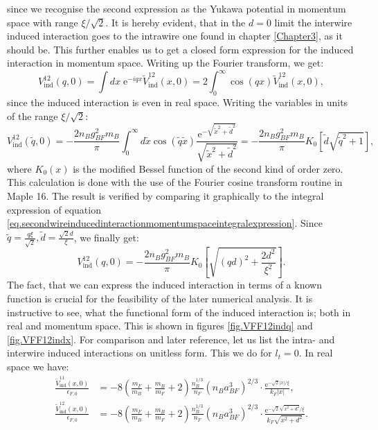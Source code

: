 since we recognise the second expression as the Yukawa potential in momentum space with range $\xi/\sqrt{2}$. It is hereby evident, that in the $d = 0$ limit the interwire induced interaction goes to the intrawire one found in chapter \ref{Chapter3}, as it should be. This further enables us to get a closed form expression for the induced interaction in momentum space. Writing up the Fourier transform, we get:
\begin{equation}
V_{\text{ind}}^{12}(q,0) = \int dx \; \text{e}^{-iqx}\tilde{V}_{\text{ind}}^{12}(x,0) = 2\int_0^\infty \cos(qx)\tilde{V}_{\text{ind}}^{12}(x,0), \nonumber
\end{equation}
since the induced interaction is even in real space. Writing the variables in units of the range $\xi/\sqrt{2}$:
\begin{equation}
V_{\text{ind}}^{12}(\tilde{q},0) = -\frac{2n_Bg^2_{BF}m_B}{\pi}\int_0^\infty d\tilde{x} \cos(\tilde{q}\tilde{x})\frac{ \text{e}^{ -\sqrt{\tilde{x}^2+\tilde{d}^2} } }{\sqrt{\tilde{x}^2+\tilde{d}^2}} = -\frac{2n_Bg^2_{BF}m_B}{\pi}K_0\left[\tilde{d}\sqrt{\tilde{q}^2+1}\right], \nonumber
\end{equation}
where $K_0(x)$ is the modified Bessel function of the second kind of order zero. This calculation is done with the use of the Fourier cosine transform routine in Maple 16. The result is verified by comparing it graphically to the integral expression of equation \eqref{eq.secondwireinducedinteractionmomentumspaceintegralexpression}. Since $\tilde{q} = \frac{q\xi}{\sqrt{2}}, \tilde{d} = \frac{\sqrt{2}d}{\xi}$, we finally get:
 \begin{equation}
V_{\text{ind}}^{12}(q,0) = -\frac{2n_Bg^2_{BF}m_B}{\pi}K_0\left[\sqrt{(qd)^2+\frac{2d^2}{\xi^2}}\right]. 
\label{eq.VFF12indq}
\end{equation}
The fact, that we can express the induced interaction in terms of a known function is crucial for the feasibility of the later numerical analysis. It is instructive to see, what the functional form of the induced interaction is; both in real and momentum space.  This is shown in figures \ref{fig.VFF12indq} and \ref{fig.VFF12indx}. For comparison and later reference, let us list the intra- and interwire induced interactions on unitless form. This we do for $l_t = 0$. In real space we have:
\begin{align}
\frac{\tilde{V}_{\text{ind}}^{11}(x,0)}{\epsilon_{F,0}} &= - 8\left( \frac{m_F}{m_B} + \frac{m_B}{m_F} + 2 \right) \frac{n_B^{1/3}}{n_F}(n_Ba_{BF}^3)^{2/3} \cdot \frac{\text{e}^{ -\sqrt{2}|x| / \xi } }{k_F|x|}, \nonumber \\
\frac{\tilde{V}_{\text{ind}}^{12}(x,0)}{\epsilon_{F,0}} &= - 8\left( \frac{m_F}{m_B} + \frac{m_B}{m_F} + 2 \right) \frac{n_B^{1/3}}{n_F}(n_Ba_{BF}^3)^{2/3} \cdot \frac{\text{e}^{ - \sqrt{2}\sqrt{x^2 + d^2} /\xi } }{k_F\sqrt{x^2 + d^2}}. 
\end{align}

